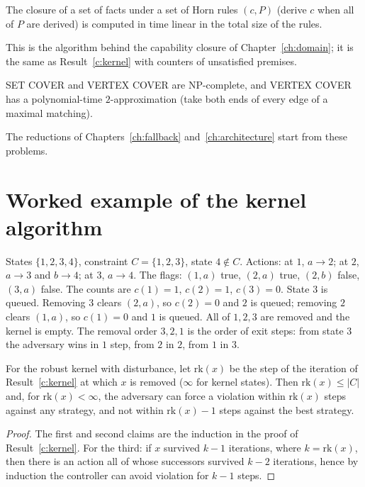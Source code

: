 \begin{established}\label{c:horn}
The closure of a set of facts under a set of Horn rules $(c,P)$ (derive $c$ when all of $P$ are derived) is computed in time linear in the total size of the rules.
\end{established}

This is the algorithm behind the capability closure of Chapter~\ref{ch:domain}; it is the same as Result~\ref{c:kernel} with counters of unsatisfied premises.

\begin{established}\label{c:np}
SET COVER and VERTEX COVER are NP-complete, and VERTEX COVER has a polynomial-time $2$-approximation (take both ends of every edge of a maximal matching).
\end{established}

The reductions of Chapters~\ref{ch:fallback} and~\ref{ch:architecture} start from these problems.

\section{Worked example of the kernel algorithm}

\begin{example}\label{c:ex-trace}
States $\{1,2,3,4\}$, constraint $C=\{1,2,3\}$, state $4\notin C$. Actions: at $1$, $a\to2$; at $2$, $a\to3$ and $b\to4$; at $3$, $a\to4$. The flags: $(1,a)$ true, $(2,a)$ true, $(2,b)$ false, $(3,a)$ false. The counts are $c(1)=1$, $c(2)=1$, $c(3)=0$. State $3$ is queued. Removing $3$ clears $(2,a)$, so $c(2)=0$ and $2$ is queued; removing $2$ clears $(1,a)$, so $c(1)=0$ and $1$ is queued. All of $1,2,3$ are removed and the kernel is empty. The removal order $3,2,1$ is the order of exit steps: from state $3$ the adversary wins in $1$ step, from $2$ in $2$, from $1$ in $3$.
\end{example}

\begin{newresult}\label{c:rank}
For the robust kernel with disturbance, let $\mathrm{rk}(x)$ be the step of the iteration of Result~\ref{c:kernel} at which $x$ is removed ($\infty$ for kernel states). Then $\mathrm{rk}(x)\le|C|$ and, for $\mathrm{rk}(x)<\infty$, the adversary can force a violation within $\mathrm{rk}(x)$ steps against any strategy, and not within $\mathrm{rk}(x)-1$ steps against the best strategy.
\end{newresult}
\begin{proof}
The first and second claims are the induction in the proof of Result~\ref{c:kernel}. For the third: if $x$ survived $k-1$ iterations, where $k=\mathrm{rk}(x)$, then there is an action all of whose successors survived $k-2$ iterations, hence by induction the controller can avoid violation for $k-1$ steps.
\end{proof}

